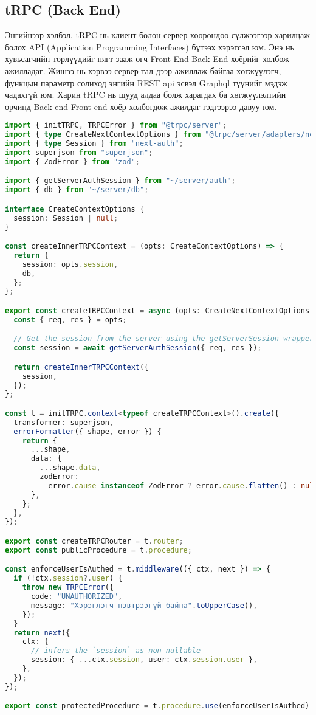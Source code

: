 \subsection{tRPC (Back End)}

Энгийнээр хэлбэл, tRPC нь клиент болон сервер хоорондоо сүлжээгээр харилцаж болох API (Application Programming Interfaces) бүтээх хэрэгсэл юм. Энэ нь хувьсагчийн төрлүүдийг нягт зааж өгч Front-End Back-End хоёрийг холбож ажилладаг. Жишээ нь хэрвээ сервер тал дээр ажиллаж байгаа хөгжүүлэгч, функцын параметр солиход энгийн REST api эсвэл Graphql түүнийг мэдэж чадахгүй юм. Харин tRPC нь шууд алдаа болж харагдах ба хөгжүүлэлтийн орчинд Back-end Front-end хоёр холбогдож ажилдаг гэдгээрээ давуу юм.

\begin{lstlisting}[language=Typescript, caption=tRPC тохиргоо, frame=single]
import { initTRPC, TRPCError } from "@trpc/server";
import { type CreateNextContextOptions } from "@trpc/server/adapters/next";
import { type Session } from "next-auth";
import superjson from "superjson";
import { ZodError } from "zod";

import { getServerAuthSession } from "~/server/auth";
import { db } from "~/server/db";

interface CreateContextOptions {
  session: Session | null;
}

const createInnerTRPCContext = (opts: CreateContextOptions) => {
  return {
    session: opts.session,
    db,
  };
};

export const createTRPCContext = async (opts: CreateNextContextOptions) => {
  const { req, res } = opts;

  // Get the session from the server using the getServerSession wrapper function
  const session = await getServerAuthSession({ req, res });

  return createInnerTRPCContext({
    session,
  });
};

const t = initTRPC.context<typeof createTRPCContext>().create({
  transformer: superjson,
  errorFormatter({ shape, error }) {
    return {
      ...shape,
      data: {
        ...shape.data,
        zodError:
          error.cause instanceof ZodError ? error.cause.flatten() : null,
      },
    };
  },
});

export const createTRPCRouter = t.router;
export const publicProcedure = t.procedure;

const enforceUserIsAuthed = t.middleware(({ ctx, next }) => {
  if (!ctx.session?.user) {
    throw new TRPCError({
      code: "UNAUTHORIZED",
      message: "Хэрэглэгч нэвтрээгүй байна".toUpperCase(),
    });
  }
  return next({
    ctx: {
      // infers the `session` as non-nullable
      session: { ...ctx.session, user: ctx.session.user },
    },
  });
});

export const protectedProcedure = t.procedure.use(enforceUserIsAuthed);

	\end{lstlisting}